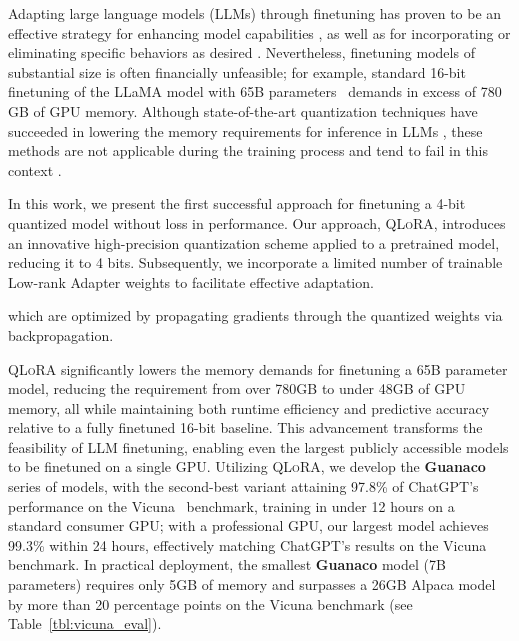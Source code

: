 Adapting large language models (LLMs) through finetuning has proven to be an effective strategy for enhancing model capabilities \citep{min2021metaicl, wei2021finetuned, ouyang2022training, wang2022super, wang2022self, liu2022few}, as well as for incorporating or eliminating specific behaviors as desired \citep{ouyang2022training,askell2021general,bai2022training}. Nevertheless, finetuning models of substantial size is often financially unfeasible; for example, standard 16-bit finetuning of the LLaMA model with 65B parameters~\citep{touvron2023llama} demands in excess of 780 GB of GPU memory. Although state-of-the-art quantization techniques have succeeded in lowering the memory requirements for inference in LLMs \citep{dettmers2022llm, dettmers2022case, frantar2022gptq, xiao2022smoothquant}, these methods are not applicable during the training process and tend to fail in this context \citep{wortsman2023stable}.

In this work, we present the first successful approach for finetuning a 4-bit quantized model without loss in performance. Our approach, \textsc{QLoRA}, introduces an innovative high-precision quantization scheme applied to a pretrained model, reducing it to 4 bits. Subsequently, we incorporate a limited number of trainable Low-rank Adapter weights \citep{hu2021lora} to facilitate effective adaptation.

which are optimized by propagating gradients through the quantized weights via backpropagation.

\textsc{QLoRA} significantly lowers the memory demands for finetuning a 65B parameter model, reducing the requirement from over 780GB to under 48GB of GPU memory, all while maintaining both runtime efficiency and predictive accuracy relative to a fully finetuned 16-bit baseline. This advancement transforms the feasibility of LLM finetuning, enabling even the largest publicly accessible models to be finetuned on a single GPU. Utilizing \textsc{QLoRA}, we develop the \textbf{Guanaco} series of models, with the second-best variant attaining 97.8\% of ChatGPT’s performance on the Vicuna~\citep{vicuna2023} benchmark, training in under 12 hours on a standard consumer GPU; with a professional GPU, our largest model achieves 99.3\% within 24 hours, effectively matching ChatGPT’s results on the Vicuna benchmark. In practical deployment, the smallest \textbf{Guanaco} model (7B parameters) requires only 5GB of memory and surpasses a 26GB Alpaca model by more than 20 percentage points on the Vicuna benchmark (see Table~\ref{tbl:vicuna_eval}).

